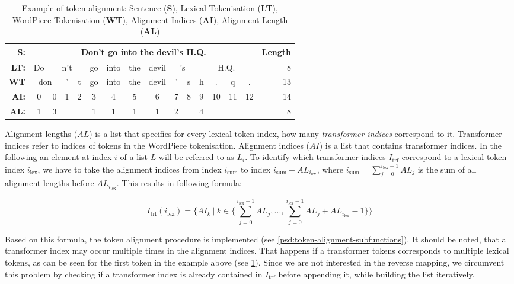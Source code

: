 \documentclass[11pt, numbers=noenddot]{scrreprt}
\begin{document}
\begin{table}[htp]
\centering
\begin{tabular}{rcccccccccccccc|r}
\textbf{S:} & \multicolumn{14}{c|}{Don't go into the devil's H.Q.} & \textbf{Length}\\
\midrule
\textbf{LT:} & Do & \multicolumn{3}{c}{n't} & go & into & the & devil &  \multicolumn{2}{c}{'s} & \multicolumn{4}{c|}{H.Q.} & 8\\
\textbf{WT} & \multicolumn{2}{c}{don} & ' & t & go & into & the & devil & '  & s & h & . & q & .  & 13\\
\midrule
\textbf{AI:} & 0 & 0 & 1 & 2 & 3 & 4 & 5 & 6 & 7 & 8 & 9 & 10 & 11 & 12 & 14 \\
\textbf{AL:} & 1 & 3 &   &   & 1 & 1 & 1 & 1 & 2 &   &  4  &   &    &  & 8 \\
\end{tabular}
\caption{Example of token alignment: Sentence (\textbf{S}), Lexical Tokenisation (\textbf{LT}), WordPiece Tokenisation (\textbf{WT}), Alignment Indices (\textbf{AI}), Alignment Length (\textbf{AL})}
\label{tab:token-alignment}
\end{table}


Alignment lengths (\(AL\)) is a list that specifies for every lexical token index, how many \textit{transformer indices} correspond to it. Transformer indices refer to indices of tokens in the WordPiece tokenisation. Alignment indices (\(AI\)) is a list that contains transformer indices. In the following an element at index \(i\) of a list \(L\) will be referred to as \(L_i\). To identify which transformer indices \(I_\text{trf}\) correspond to a lexical token index \(i_{\text{lex}}\), we have to take the alignment indices from index \(i_{\text{sum}}\) to index \(i_{\text{sum}} + AL_{i_{\text{lex}}}\), where \(i_{\text{sum}} = \sum_{j = 0}^{i_{\text{lex}} - 1} AL_j\) is the sum of all alignment lengths before \(AL_{i_\text{lex}}\). This results in following formula: 

\[I_{\text{trf}}(i_\text{lex}) = \{AI_k\ |\ k \in \{\sum_{j = 0}^{i_{\text{lex}} - 1} AL_j, ..., \sum_{j = 0}^{i_{\text{lex}} - 1} AL_j + AL_{i_{\text{lex}}} - 1 \}\}\]

Based on this formula, the token alignment procedure is implemented (see \cref{psd:token-alignment-subfunctions}). It should be noted, that a transformer index may occur multiple times in the alignment indices. That happens if a transformer tokens corresponds to multiple lexical tokens, as can be seen for the first token in the example above (see \cref{tab:token-alignment}). Since we are not interested in the reverse mapping, we circumvent this problem by checking if a transformer index is already contained in \(I_\text{trf}\) before appending it, while building the list iteratively.
\end{document}
